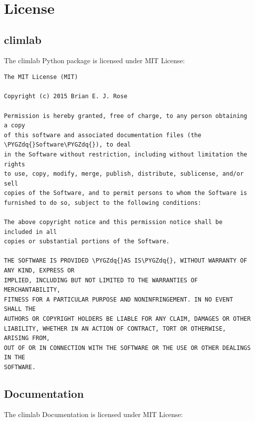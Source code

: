 \documentclass[a4paper,10pt,english]{sphinxmanual}
\def\PYGZdq{\char`\"}
\begin{document}
\chapter{License}
\label{license::doc}\label{license:license}

\section{climlab}
\label{license:climlab}
The climlab Python package is licensed under MIT License:

\begin{Verbatim}[commandchars=\\\{\}]
The MIT License (MIT)

Copyright (c) 2015 Brian E. J. Rose

Permission is hereby granted, free of charge, to any person obtaining a copy
of this software and associated documentation files (the \PYGZdq{}Software\PYGZdq{}), to deal
in the Software without restriction, including without limitation the rights
to use, copy, modify, merge, publish, distribute, sublicense, and/or sell
copies of the Software, and to permit persons to whom the Software is
furnished to do so, subject to the following conditions:

The above copyright notice and this permission notice shall be included in all
copies or substantial portions of the Software.

THE SOFTWARE IS PROVIDED \PYGZdq{}AS IS\PYGZdq{}, WITHOUT WARRANTY OF ANY KIND, EXPRESS OR
IMPLIED, INCLUDING BUT NOT LIMITED TO THE WARRANTIES OF MERCHANTABILITY,
FITNESS FOR A PARTICULAR PURPOSE AND NONINFRINGEMENT. IN NO EVENT SHALL THE
AUTHORS OR COPYRIGHT HOLDERS BE LIABLE FOR ANY CLAIM, DAMAGES OR OTHER
LIABILITY, WHETHER IN AN ACTION OF CONTRACT, TORT OR OTHERWISE, ARISING FROM,
OUT OF OR IN CONNECTION WITH THE SOFTWARE OR THE USE OR OTHER DEALINGS IN THE
SOFTWARE.
\end{Verbatim}


\section{Documentation}
\label{license:documentation}
The climlab Documentation is licensed under MIT License:
\end{document}
